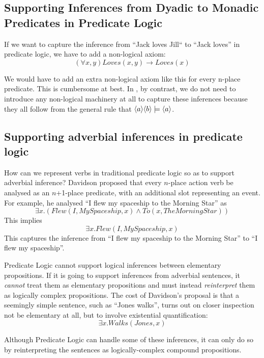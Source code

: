 \subsection{Supporting Inferences from Dyadic to Monadic Predicates in Predicate Logic}
If we want to capture the inference from ``Jack loves Jill`` to ``Jack loves'' in predicate logic, we have to add a non-logical axiom:
\[
(\forall x, y) Loves(x,y) \rightarrow Loves(x)
\]

\NI We would have to add an extra non-logical axiom like this for every
n-place predicate.  This is cumbersome at best.  In \ELABR{}, by
contrast, we do not need to introduce any non-logical machinery at all
to capture these inferences because they all follow from the general
rule that $\MAY{a} \MAY{b} \models \MAY{a}$.

\subsection{Supporting adverbial inferences in predicate logic}

\NI How can we represent verbs in traditional predicate logic so as to
support adverbial inference?  Davidson \cite{davidson2} proposed that
every $n$-place action verb be analysed as an $n$+1-place predicate,
with an additional slot representing an event.  For example, he
analysed ``I flew my spaceship to the Morning Star'' as
\[
\exists x. ( Flew(I, MySpaceship, x) \land To(x, TheMorningStar))
\]
This implies 
\[
\exists x.  Flew(I, MySpaceship, x)
\]
This captures the inference from ``I flew my spaceship to the Morning Star'' to ``I flew my spaceship''.

Predicate Logic cannot support logical inferences between elementary propositions. 
If it is going to support inferences from adverbial sentences, it \emph{cannot} treat them as elementary propositions and must instead \emph{reinterpret} them as logically complex propositions.
The cost of Davidson's proposal is that a seemingly simple sentence, such as ``Jones walks'', turns out on closer inspection not be elementary at all,  but to involve existential quantification:
\[
\exists x.  Walks(Jones, x)
\]

\NI Although Predicate Logic can handle some of these inferences, it
can only do so by reinterpreting the sentences as logically-complex
compound propositions.

